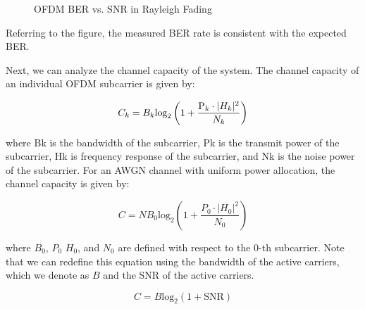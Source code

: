 \documentclass[conference]{IEEEtran}
\begin{document}
    		\begin{figure}[H]
			\centering
    			\caption{OFDM BER vs. SNR in Rayleigh Fading}
    			\label{fig::ofdm_fading_ber}
  	  	\end{figure}
  	  
  	  	Referring to the figure, the measured BER rate is consistent with the expected BER.
    	    	  
    	  Next, we can analyze the channel capacity of the system. The channel capacity of an individual OFDM subcarrier is given by:
    	  
    	  \begin{equation}
			C_{k} = B_{k}\text{log}_2\left(1 +\frac{ \text P_{k}\cdot|H_{k}|^2}{N_{k}}\right)
	    		\label{eq:ofdm_subcarrier_capacity}
	    	\end{equation}
	    	
	    	where Bk is the bandwidth of the subcarrier, Pk is the transmit power of the subcarrier, Hk is frequency response of the subcarrier, and Nk is the noise power of the subcarrier. For an AWGN channel with uniform power allocation, the channel capacity is given by:
	    	
	    	\begin{equation}
	    		C = NB_0\text{log}_2\left(1 + \frac{P_0\cdot|H_0|^2}{N_0}\right)
	    	\end{equation}
	    	
	    	where $B_0$, $P_0$ $H_0$, and $N_0$ are defined with respect to the 0-th subcarrier. Note that we can redefine this equation using the bandwidth of the active carriers, which we denote as $B$ and the SNR of the active carriers.
	    	
	    	\begin{equation}
	    		C = B\text{log}_2\left(1 + \text{SNR}\right)
	    		\label{eq::chan_capacity_simplified}
	    	\end{equation} 
	    	
\end{document}

